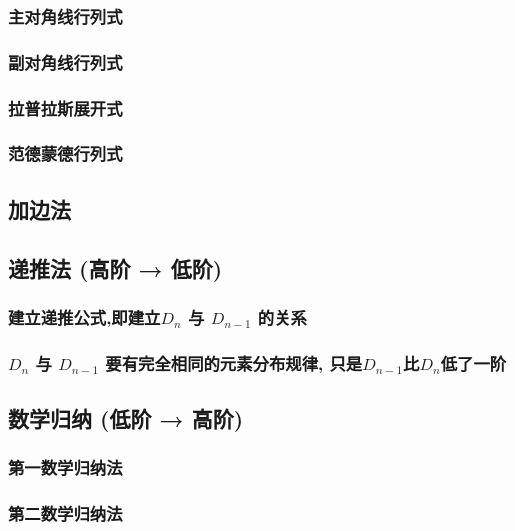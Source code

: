 \documentclass[UTF8]{ctexart}
\begin{document}
		\subsubsection{主对角线行列式}
		
		\subsubsection{副对角线行列式}
		
		\subsubsection{拉普拉斯展开式}
		
		\subsubsection{范德蒙德行列式}
	
	\subsection{加边法}
	
	\subsection{递推法 (高阶 → 低阶)}
	
		\subsubsection{建立递推公式,即建立$D_n$ 与 $D_{n-1}$ 的关系}
		
		\subsubsection{$D_n$ 与 $D_{n-1}$ 要有完全相同的元素分布规律, 只是$D_{n-1}$比$D_n$低了一阶 }
	
	
	\subsection{数学归纳 (低阶 → 高阶)}
	
		\subsubsection{第一数学归纳法}
		
		\subsubsection{第二数学归纳法}
	
\end{document}
